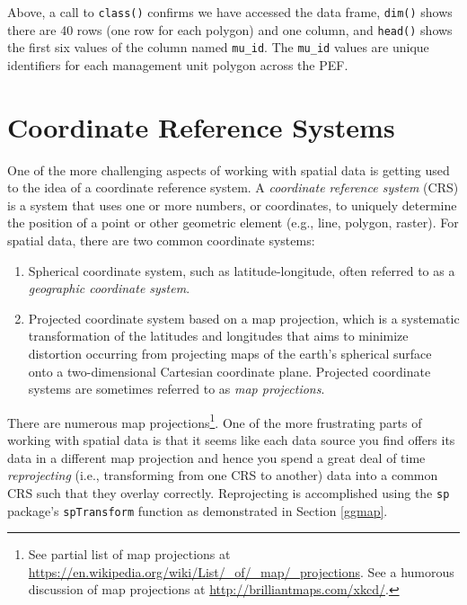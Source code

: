 \documentclass[
]{krantz}
\providecommand{\tightlist}{%
  \setlength{\itemsep}{0pt}\setlength{\parskip}{0pt}}
\begin{document}
Above, a call to \texttt{class()} confirms we have accessed the data frame, \texttt{dim()} shows there are 40 rows (one row for each polygon) and one column, and \texttt{head()} shows the first six values of the column named \texttt{mu\_id}. The \texttt{mu\_id} values are unique identifiers for each management unit polygon across the PEF.

\hypertarget{coordinate-reference-systems}{%
\section{Coordinate Reference Systems}\label{coordinate-reference-systems}}

One of the more challenging aspects of working with spatial data is getting used to the idea of a coordinate reference system. A \emph{coordinate reference system} (CRS) is a system that uses one or more numbers, or coordinates, to uniquely determine the position of a point or other geometric element (e.g., line, polygon, raster). For spatial data, there are two common coordinate systems:

\begin{enumerate}
\def\labelenumi{\arabic{enumi}.}
\tightlist
\item
  Spherical coordinate system, such as latitude-longitude, often referred to as a \emph{geographic coordinate system}.
\item
  Projected coordinate system based on a map projection, which is a systematic transformation of the latitudes and longitudes that aims to minimize distortion occurring from projecting maps of the earth's spherical surface onto a two-dimensional Cartesian coordinate plane. Projected coordinate systems are sometimes referred to as \emph{map projections}.
\end{enumerate}

There are numerous map projections\footnote{See partial list of map projections at \url{https://en.wikipedia.org/wiki/List/_of/_map/_projections}. See a humorous discussion of map projections at \url{http://brilliantmaps.com/xkcd/}.}. One of the more frustrating parts of working with spatial data is that it seems like each data source you find offers its data in a different map projection and hence you spend a great deal of time \emph{reprojecting} (i.e., transforming from one CRS to another) data into a common CRS such that they overlay correctly. Reprojecting is accomplished using the \texttt{sp} package's \texttt{spTransform} function as demonstrated in Section \ref{ggmap}.
\end{document}
